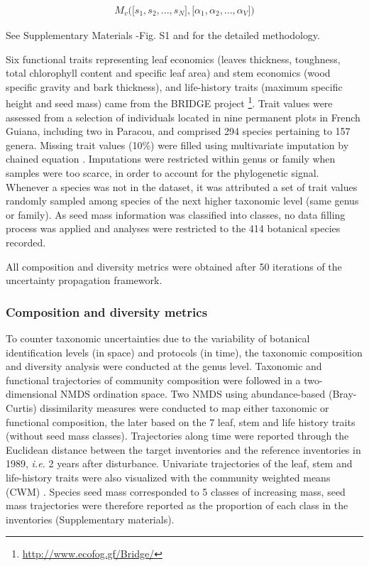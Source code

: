 \documentclass[
  11pt,
  french,
  A4paper,
  extrafontsizes,onecolumn,openright
  ]{memoir}
\begin{document}
\begin{align}
M_v\Big(\big[s_1, s_2,..., s_N\big],\big[\alpha_1, \alpha_2,..., \alpha_V\big]\Big) \nonumber
\end{align}

See Supplementary Materials -Fig. S1 and \textcite{Aubry-Kientz2013} for
the detailed methodology.

Six functional traits representing leaf economics (leaves thickness,
toughness, total chlorophyll content and specific leaf area) and stem
economics (wood specific gravity and bark thickness), and life-history
traits (maximum specific height and seed mass) came from the BRIDGE
project \footnote{\url{http://www.ecofog.gf/Bridge/}}. Trait values were
assessed from a selection of individuals located in nine permanent plots
in French Guiana, including two in Paracou, and comprised 294 species
pertaining to 157 genera. Missing trait values (10\%) were filled using
multivariate imputation by chained equation \autocite{Mice2011}.
Imputations were restricted within genus or family when samples were too
scarce, in order to account for the phylogenetic signal. Whenever a
species was not in the dataset, it was attributed a set of trait values
randomly sampled among species of the next higher taxonomic level (same
genus or family). As seed mass information was classified into classes,
no data filling process was applied and analyses were restricted to the
414 botanical species recorded.

All composition and diversity metrics were obtained after 50 iterations
of the uncertainty propagation framework.

\subsubsection{Composition and diversity
metrics}\label{composition-and-diversity-metrics}

To counter taxonomic uncertainties due to the variability of botanical
identification levels (in space) and protocols (in time), the taxonomic
composition and diversity analysis were conducted at the genus level.
Taxonomic and functional trajectories of community composition were
followed in a two-dimensional NMDS ordination space. Two NMDS using
abundance-based (Bray-Curtis) dissimilarity measures were conducted to
map either taxonomic or functional composition, the later based on the 7
leaf, stem and life history traits (without seed mass classes).
Trajectories along time were reported through the Euclidean distance
between the target inventories and the reference inventories in 1989,
\emph{i.e.} 2 years after disturbance. Univariate trajectories of the
leaf, stem and life-history traits were also visualized with the
community weighted means (CWM) \autocite{Diaz2007}. Species seed mass
corresponded to 5 classes of increasing mass, seed mass trajectories
were therefore reported as the proportion of each class in the
inventories (Supplementary materials).
\end{document}
